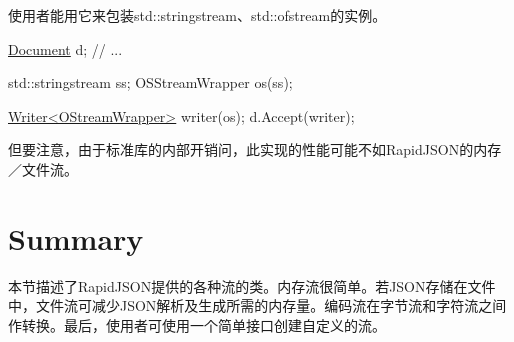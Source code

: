 使用者能用它来包装{\ttfamily std\+::stringstream}、{\ttfamily std\+::ofstream}的实例。


\begin{DoxyCode}
\hyperlink{class_generic_document}{Document} d;
\textcolor{comment}{// ...}

std::stringstream ss;
OSStreamWrapper os(ss);

\hyperlink{class_writer}{Writer<OStreamWrapper>} writer(os);
d.Accept(writer);
\end{DoxyCode}


但要注意，由于标准库的内部开销问，此实现的性能可能不如\+Rapid\+J\+S\+O\+N的内存／文件流。\hypertarget{md_Commun_Externe_RapidJSON_doc_stream.zh-cn_Summary}{}\section{Summary}\label{md_Commun_Externe_RapidJSON_doc_stream.zh-cn_Summary}
本节描述了\+Rapid\+J\+S\+O\+N提供的各种流的类。内存流很简单。若\+J\+S\+O\+N存储在文件中，文件流可减少\+J\+S\+O\+N解析及生成所需的内存量。编码流在字节流和字符流之间作转换。最后，使用者可使用一个简单接口创建自定义的流。 